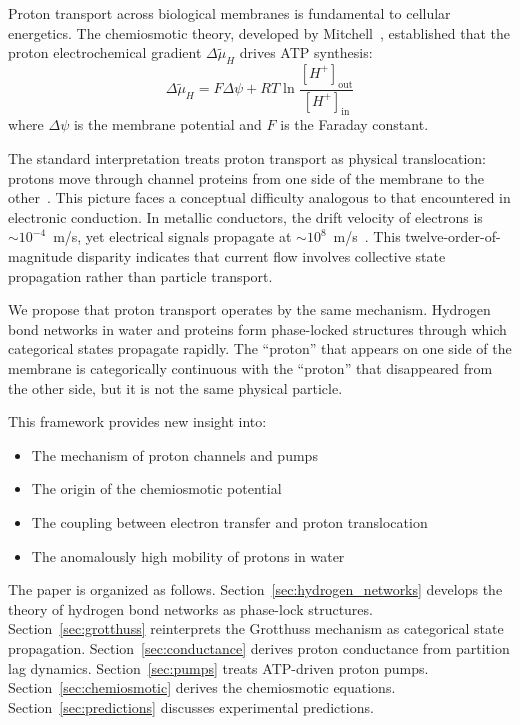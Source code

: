 \documentclass[twocolumn,showpacs,preprintnumbers,amsmath,amssymb,prd]{revtex4-2}
\begin{document}
Proton transport across biological membranes is fundamental to cellular energetics. The chemiosmotic theory, developed by Mitchell~\cite{Mitchell1961}, established that the proton electrochemical gradient $\Delta\tilde{\mu}_H$ drives ATP synthesis:
\begin{equation}
\Delta\tilde{\mu}_H = F\Delta\psi + RT\ln\frac{[H^+]_{\text{out}}}{[H^+]_{\text{in}}}
\label{eq:electrochemical}
\end{equation}
where $\Delta\psi$ is the membrane potential and $F$ is the Faraday constant.

The standard interpretation treats proton transport as physical translocation: protons move through channel proteins from one side of the membrane to the other~\cite{Nicholls2013}. This picture faces a conceptual difficulty analogous to that encountered in electronic conduction. In metallic conductors, the drift velocity of electrons is $\sim 10^{-4}$~m/s, yet electrical signals propagate at $\sim 10^8$~m/s~\cite{Griffiths2017}. This twelve-order-of-magnitude disparity indicates that current flow involves collective state propagation rather than particle transport.

We propose that proton transport operates by the same mechanism. Hydrogen bond networks in water and proteins form phase-locked structures through which categorical states propagate rapidly. The ``proton'' that appears on one side of the membrane is categorically continuous with the ``proton'' that disappeared from the other side, but it is not the same physical particle.

This framework provides new insight into:
\begin{itemize}
\item The mechanism of proton channels and pumps
\item The origin of the chemiosmotic potential
\item The coupling between electron transfer and proton translocation
\item The anomalously high mobility of protons in water
\end{itemize}

The paper is organized as follows. Section~\ref{sec:hydrogen_networks} develops the theory of hydrogen bond networks as phase-lock structures. Section~\ref{sec:grotthuss} reinterprets the Grotthuss mechanism as categorical state propagation. Section~\ref{sec:conductance} derives proton conductance from partition lag dynamics. Section~\ref{sec:pumps} treats ATP-driven proton pumps. Section~\ref{sec:chemiosmotic} derives the chemiosmotic equations. Section~\ref{sec:predictions} discusses experimental predictions.
\end{document}
